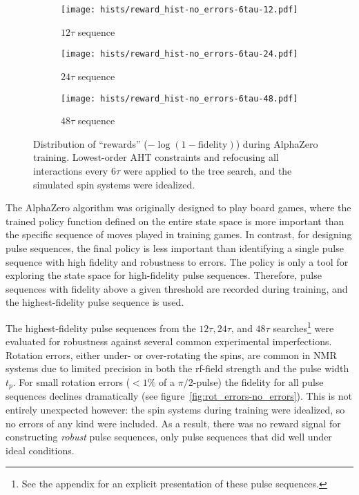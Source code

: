 \begin{figure}[H]
    \centering
    \begin{subfigure}{.49\textwidth}
        \centering
        \texttt{[image: hists/reward\_hist-no\_errors-6tau-12.pdf]}
        \caption{$12\tau$ sequence}
        \label{fig:reward_hist-no_errors-6tau-12}
    \end{subfigure}
    \begin{subfigure}{.49\textwidth}
        \centering
        \texttt{[image: hists/reward\_hist-no\_errors-6tau-24.pdf]}
        \caption{$24\tau$ sequence}
        \label{fig:reward_hist-no_errors-6tau-24}
    \end{subfigure}
    \begin{subfigure}{.49\textwidth}
        \centering
        \texttt{[image: hists/reward\_hist-no\_errors-6tau-48.pdf]}
        \caption{$48\tau$ sequence}
        \label{fig:reward_hist-no_errors-6tau-48}
    \end{subfigure}
    \caption{Distribution of ``rewards'' ($-\log(1 - \text{fidelity})$) during AlphaZero training. Lowest-order AHT constraints and refocusing all interactions every $6\tau$ were applied to the tree search, and the simulated spin systems were idealized.}
    \label{fig:reward_hist-no_errors-6tau}
\end{figure}

The AlphaZero algorithm was originally designed to play board games, where the trained policy function defined on the entire state space is more important than the specific sequence of moves played in training games. In contrast, for designing pulse sequences, the final policy is less important than identifying a single pulse sequence with high fidelity and robustness to errors. The policy is only a tool for exploring the state space for high-fidelity pulse sequences. Therefore, pulse sequences with fidelity above a given threshold are recorded during training, and the highest-fidelity pulse sequence is used.


The highest-fidelity pulse sequences from the $12\tau, 24\tau$, and $48\tau$ searches\footnote{
See the appendix for an explicit presentation of these pulse sequences.
} were evaluated for robustness against several common experimental imperfections. Rotation errors, either under- or over-rotating the spins, are common in NMR systems due to limited precision in both the rf-field strength and the pulse width $t_p$. For small rotation errors ($<1\%$ of a $\pi/2$-pulse) the fidelity for all pulse sequences declines dramatically (see figure~\ref{fig:rot_errors-no_errors}).
This is not entirely unexpected however: the spin systems during training were idealized, so no errors of any kind were included. As a result, there was no reward signal for constructing \emph{robust} pulse sequences, only pulse sequences that did well under ideal conditions.


